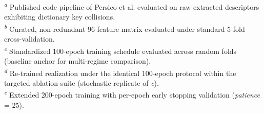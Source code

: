 \begin{table}[htbp]
\centering
\caption{Cross-Validation Performance on the Unified Fe--S Redox Potential Benchmark ($N=364$)}
\label{tab:benchmark_summary}
\vspace{1ex}
\raggedright
\footnotesize
\textsuperscript{\emph{a}} Published code pipeline of Persico et al.\cite{persico2025predicting} evaluated on raw extracted descriptors exhibiting dictionary key collisions.\\
\textsuperscript{\emph{b}} Curated, non-redundant 96-feature matrix evaluated under standard 5-fold cross-validation.\\
\textsuperscript{\emph{c}} Standardized 100-epoch training schedule evaluated across random folds (baseline anchor for multi-regime comparison).\\
\textsuperscript{\emph{d}} Re-trained realization under the identical 100-epoch protocol within the targeted ablation suite (stochastic replicate of \emph{c}).\\
\textsuperscript{\emph{e}} Extended 200-epoch training with per-epoch early stopping validation (\emph{patience} = 25).
\end{table}
